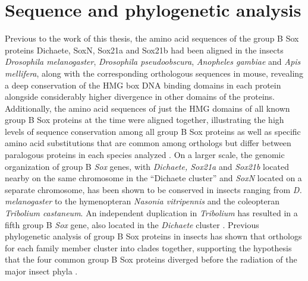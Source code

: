 \section{Sequence and phylogenetic analysis}
Previous to the work of this thesis, the amino acid sequences of the group B Sox proteins Dichaete, SoxN, Sox21a and Sox21b had been aligned in the insects \emph{Drosophila melanogaster}, \emph{Drosophila pseudoobscura}, \emph{Anopheles gambiae} and \emph{Apis mellifera}, along with the corresponding orthologous sequences in mouse, revealing a deep conservation of the HMG box DNA binding domains in each protein alongside considerably higher divergence in other domains of the proteins. Additionally, the amino acid sequences of just the HMG domains of all known group B Sox proteins at the time were aligned together, illustrating the high levels of sequence conservation among all group B Sox proteins as well as specific amino acid substitutions that are common among orthologs but differ between paralogous proteins in each species analyzed \citep{mckimmie_conserved_2005}. On a larger scale, the genomic organization of group B \emph{Sox} genes, with \emph{Dichaete, Sox21a} and \emph{Sox21b} located nearby on the same chromosome in the “Dichaete cluster” and \emph{SoxN} located on a separate chromosome, has been shown to be conserved in insects ranging from \emph{D. melanogaster} to the hymenopteran \emph{Nasonia vitripennis} and the coleopteran \emph{Tribolium castaneum}. An independent duplication in \emph{Tribolium} has resulted in a fifth group B \emph{Sox} gene, also located in the \emph{Dichaete} cluster \citep{phochanukul_no_2010}. Previous phylogenetic analysis of group B Sox proteins in insects has shown that orthologs for each family member cluster into clades together, supporting the hypothesis that the four common group B Sox proteins diverged before the radiation of the major insect phyla \citep{wilson_evolution_2008,zhong_parallel_2011}.

